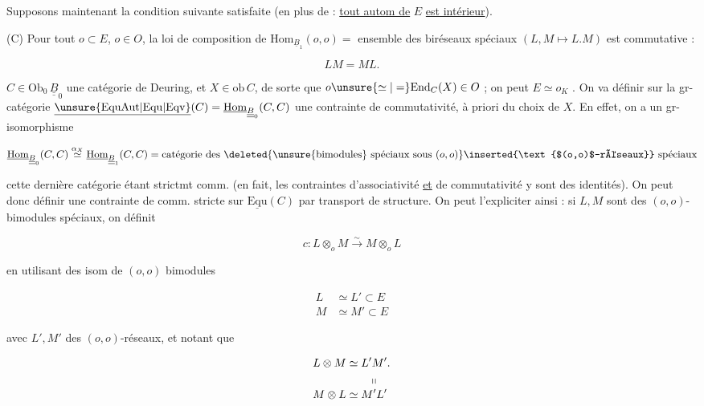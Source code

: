 Supposons maintenant la condition suivante satisfaite (en plus de : \uline{tout autom de} $E$ \uline{est intérieur}).

(C) Pour tout $o\subset E$, $o\in O$, la loi de composition de $\mathrm{Hom}_{\underline B_1}(o,o)=$ ensemble des biréseaux spéciaux   $(L,M\longmapsto L.M)$ est commutative :

\[
LM=ML.
\]


$C\in\mathrm{Ob}_0\,\underline{\underline B}_0$ une catégorie de Deuring, et $X\in\mathrm{ob}\,C$, de sorte que $o\unsure{\simeq|=}\mathrm{End}_C(X)\in O$ ; on peut   $E\simeq o_K$ . On va définir sur la gr-catégorie $\underline{\unsure{\mathrm{EquAut}|\mathrm{Equ}|\mathrm{Eqv}}}(C)=\underline{\mathrm{Hom}}_{\underline{\underline B}_0}(C,C)$ une  contrainte de commutativité,   à priori du choix de $X$. En effet, on a un gr-isomorphisme

\[
\underline{\mathrm{Hom}}_{\underline{\underline B}_0}(C,C)
\overset{\alpha_X}{\simeq}
\underline{\mathrm{Hom}}_{\underline{\underline B}_1}(C,C)
=\text{catégorie des }\deleted{\text{\unsure{bimodules} spéciaux sous }(o,o)}
\inserted{\text{$(o,o)$-réseaux}}\text{ spéciaux}
\]

cette dernière catégorie étant  strictmt comm. (en fait, les contraintes d'associativité \uline{et} de commutativité y sont des identités). On peut donc définir une contrainte de comm. stricte sur $\underline{\mathrm{Equ}}(C)$ par transport de structure. On peut l'expliciter ainsi : si $L,M$ sont des $(o,o)$-bimodules spéciaux, on définit

\[
c:L\otimes_o M\overset{\sim}{\longrightarrow}M\otimes_o L
\]

en  utilisant des isom de $(o,o)$ bimodules

\[
\begin{aligned}L&\simeq L'\subset E\\M&\simeq M'\subset E\end{aligned}
\]

avec $L',M'$ des $(o,o)$-réseaux, et notant que

\[
\begin{aligned}
L\otimes M&\simeq L'M'.\\
&\phantom{\simeq L'}\shortparallel\\[-.5ex]
M\otimes L&\simeq M'L'
\end{aligned}
\]

